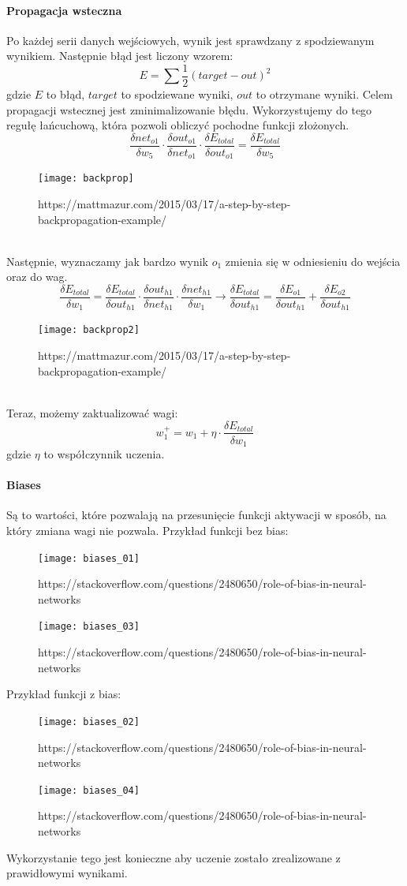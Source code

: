 \documentclass[12pt,a4paper]{article}
\begin{document}
\paragraph*{Propagacja wsteczna} 
Po każdej serii danych wejściowych, wynik jest sprawdzany z spodziewanym wynikiem. Następnie błąd jest liczony wzorem:
$$ E = \sum{\frac{1}{2}(target - out)^2} $$
gdzie $E$ to błąd, $target$ to spodziewane wyniki, $out$ to otrzymane wyniki.
Celem propagacji wstecznej jest zminimalizowanie błędu. Wykorzystujemy do tego regułę łańcuchową, która pozwoli obliczyć pochodne funkcji złożonych.
$$ \frac{\delta net_{o1}}{\delta w_5} \cdot \frac{\delta out_{o1}}{\delta net_{o1}} \cdot \frac{\delta E_{total}}{\delta out_{o1}} = \frac{\delta E_{total}}{\delta w_5} $$
\begin{figure}[hp]
\centering
\texttt{[image: backprop]}
\caption{https://mattmazur.com/2015/03/17/a-step-by-step-backpropagation-example/}
\end{figure}\\
Następnie, wyznaczamy jak bardzo wynik $o_1$ zmienia się w odniesieniu do wejścia oraz do wag. 
$$ \frac{\delta E_{total}}{\delta w_1}  = \frac{\delta E_{total}}{\delta out_{h1}} \cdot \frac{\delta out_{h1}}{\delta net_{h1}} \cdot \frac{\delta net_{h1}}{\delta w_1} \longrightarrow \frac{\delta E_{total}}{\delta out_{h1}} = \frac{\delta E_{o1}}{\delta out_{h1}} + \frac{\delta E_{o2}}{\delta out_{h1}}$$
\begin{figure}[h]
\centering
\texttt{[image: backprop2]}
\caption{https://mattmazur.com/2015/03/17/a-step-by-step-backpropagation-example/}
\end{figure}\\
Teraz, możemy zaktualizować wagi:
$$ w_1^+ = w_1 + \eta \cdot \frac{\delta E_{total}}{\delta w_1}  $$
gdzie $\eta$ to współczynnik uczenia.
\paragraph*{Biases} Są to wartości, które pozwalają na przesunięcie funkcji aktywacji w sposób, na który zmiana wagi nie pozwala. Przykład funkcji bez bias:
\begin{figure}[H]
\centering
\texttt{[image: biases\_01]}
\caption{https://stackoverflow.com/questions/2480650/role-of-bias-in-neural-networks}
\end{figure}
\begin{figure}[H]
\centering
\texttt{[image: biases\_03]}
\caption{https://stackoverflow.com/questions/2480650/role-of-bias-in-neural-networks}
\end{figure}\clearpage
Przykład funkcji z bias:
\begin{figure}[H]
\centering
\texttt{[image: biases\_02]}
\caption{https://stackoverflow.com/questions/2480650/role-of-bias-in-neural-networks}
\end{figure}
\begin{figure}[H]
\centering
\texttt{[image: biases\_04]}
\caption{https://stackoverflow.com/questions/2480650/role-of-bias-in-neural-networks}
\end{figure}
Wykorzystanie tego jest konieczne aby uczenie zostało zrealizowane z prawidłowymi wynikami.
\end{document}
